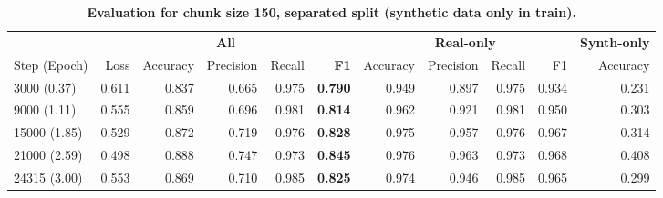 \begin{table}[H]
\centering
\small
\caption[Evaluation for Chunk Size 150, Separated Split]{\textbf{Evaluation for chunk size 150, separated split (synthetic data only in train).}}
\label{tab:150_separated}
\begin{tabular}{@{}l *{10}{r} @{}}
\toprule
  & \multicolumn{5}{c}{\textbf{All}} 
  & \multicolumn{4}{c}{\textbf{Real-only}} 
  & \multicolumn{1}{c}{\textbf{Synth-only}} \\
\cmidrule(lr){2-6} \cmidrule(lr){7-10} \cmidrule(lr){11-11}
Step (Epoch) & Loss & Accuracy & Precision & Recall & \textbf{F1}
& Accuracy & Precision & Recall & F1
& Accuracy \\
\midrule
3000 (0.37)  & 0.611 & 0.837 & 0.665 & 0.975 & \textbf{0.790} & 0.949 & 0.897 & 0.975 & 0.934 & 0.231 \\
9000 (1.11)  & 0.555 & 0.859 & 0.696 & 0.981 & \textbf{0.814} & 0.962 & 0.921 & 0.981 & 0.950 & 0.303 \\
15000 (1.85) & 0.529 & 0.872 & 0.719 & 0.976 & \textbf{0.828} & 0.975 & 0.957 & 0.976 & 0.967 & 0.314 \\
21000 (2.59) & 0.498 & 0.888 & 0.747 & 0.973 & \textbf{0.845} & 0.976 & 0.963 & 0.973 & 0.968 & 0.408 \\
24315 (3.00) & 0.553 & 0.869 & 0.710 & 0.985 & \textbf{0.825} & 0.974 & 0.946 & 0.985 & 0.965 & 0.299 \\
\bottomrule
\end{tabular}
\end{table}
